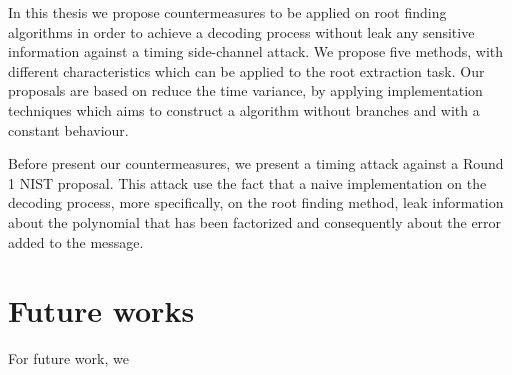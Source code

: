 In this thesis we propose countermeasures to be applied on root finding algorithms in order to achieve a decoding process without leak any sensitive information against a timing side-channel attack. We propose five methods, with different characteristics which can be applied to the root extraction task. Our proposals are based on reduce the time variance, by applying implementation techniques which aims to construct a algorithm without branches and with a constant behaviour. 

Before present our countermeasures, we present a timing attack against a Round 1 NIST proposal. This attack use the fact that a naive implementation on the decoding process, more specifically, on the root finding method, leak information about the polynomial that has been factorized and consequently about the error added to the message. 

\section{Future works}
For future work, we 